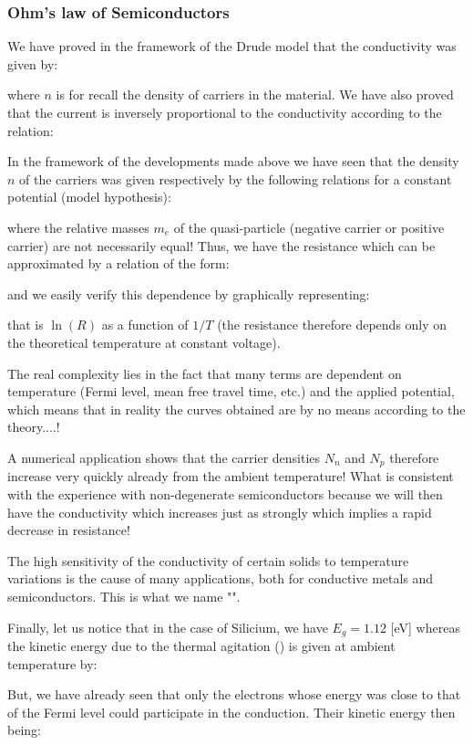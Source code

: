 	\subsubsection{Ohm's law of Semiconductors}
	We have proved in the framework of the Drude model that the conductivity was given by:
	
	where $n$ is for recall the density of carriers in the material. We have also proved that the current is inversely proportional to the conductivity according to the relation:
	
	In the framework of the developments made above we have seen that the density $n$ of the carriers was given respectively by the following relations for a constant potential (model hypothesis):
	
	where the relative masses $m_e$ of the quasi-particle (negative carrier or positive carrier) are not necessarily equal! Thus, we have the resistance which can be approximated by a relation of the form:
	
	and we easily verify this dependence by graphically representing:
	
	that is $\ln(R)$ as a function of $1/T$ (the resistance therefore depends only on the theoretical temperature at constant voltage).
	
	The real complexity lies in the fact that many terms are dependent on temperature (Fermi level, mean free travel time, etc.) and the applied potential, which means that in reality the curves obtained are by no means according to the theory....!
	
	A numerical application shows that the carrier densities $N_n$ and $N_p$ therefore increase very quickly already from the ambient temperature! What is consistent with the experience with non-degenerate semiconductors because we will then have the conductivity which increases just as strongly which implies a rapid decrease in resistance!
	
	The high sensitivity of the conductivity of certain solids to temperature variations is the cause of many applications, both for conductive metals and semiconductors. This is what we name "".
	
	Finally, let us notice that in the case of Silicium, we have $E_g=1.12$ [eV] whereas the kinetic energy due to the thermal agitation () is given at ambient temperature by:
	
	But, we have already seen that only the electrons whose energy was close to that of the Fermi level could participate in the conduction. Their kinetic energy then being:
	
